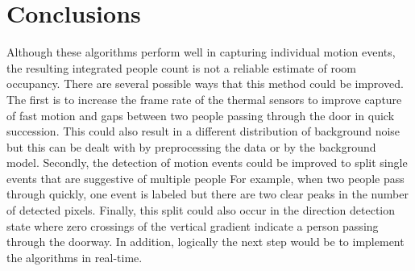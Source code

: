 \documentclass[12pt,oneside]{article} %
\begin{document}
\section{Conclusions} %
Although these algorithms perform well in capturing individual motion events, the resulting integrated people count is 
not a reliable estimate of room occupancy. There are several possible ways that this method could be improved. The
first is to increase the frame rate of the thermal sensors to improve capture of fast motion and gaps between 
two people passing through the door in quick succession. This could also result in a different distribution of 
background noise but this can be dealt with by preprocessing the data or by the background model. Secondly,
the detection of motion events could be improved to split single events that are suggestive of multiple people
For example, when two people pass through quickly, one event is labeled but there are two clear peaks in the
number of detected pixels. Finally, this split could also occur in the direction detection state where zero crossings
of the vertical gradient indicate a person passing through the doorway. In addition, logically the next step would be
to implement the algorithms in real-time.


\parskip=0pt
\parsep=0pt
\clearpage



\end{document}
